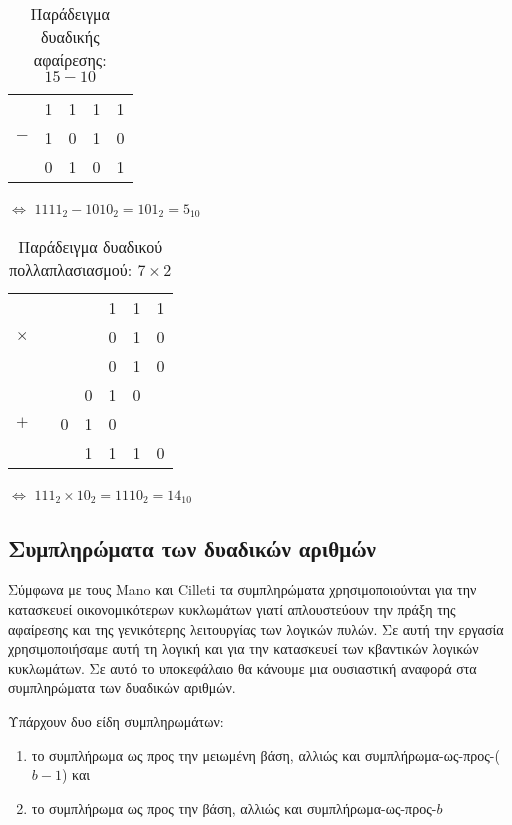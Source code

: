 \qquad

\begin{table}[ht]
    \centering
    \begin{tabular}{ccccc}
          & 1 & 1 & 1 & 1 \\
        $-$ & 1 & 0 & 1 & 0 \\
        \hline
          & 0 & 1 & 0 & 1 \\
    \end{tabular}
    \hspace{1cm}
    $\Longleftrightarrow $
    \hspace{1cm}
    $1111_2 - 1010_2 = 101_2 = 5_{10}$
    \caption{Παράδειγμα δυαδικής αφαίρεσης: $15 - 10$}
\end{table}

\qquad

\begin{table}[ht]
    \centering
    \begin{tabular}{ccccccc}
        &&&&1&1&1\\
        $\times$&&&&0&1&0\\
        \hline
        &&&&0&1&0\\
        &&&0&1&0&\\
        $+$&&0&1&0&&\\
        \hline
        &&&1&1&1&0\\
    \end{tabular}
    \hspace{1cm}
    $\Longleftrightarrow $
    \hspace{1cm}
    $111_2 \times 10_2 = 1110_2 = 14_{10}$
    \caption{Παράδειγμα δυαδικού πολλαπλασιασμού: $7 \times 2$}
\end{table}

\subsection{Συμπληρώματα των δυαδικών αριθμών}

Σύμφωνα με τους Mano και Cilleti \cite{ManoCilleti2018} τα συμπληρώματα χρησιμοποιούνται για την κατασκευεί οικονομικότερων κυκλωμάτων γιατί
απλουστεύουν την πράξη της αφαίρεσης και της γενικότερης λειτουργίας των λογικών πυλών. Σε αυτή την εργασία χρησιμοποιήσαμε αυτή τη λογική και για
την κατασκευεί των κβαντικών λογικών κυκλωμάτων. Σε αυτό το υποκεφάλαιο θα κάνουμε μια ουσιαστική αναφορά στα συμπληρώματα των δυαδικών αριθμών.

Υπάρχουν δυο είδη συμπληρωμάτων:

\begin{enumerate}
    \item το συμπλήρωμα ως προς την μειωμένη βάση, αλλιώς και συμπλήρωμα-ως-προς-($b-1$) και
    \item το συμπλήρωμα ως προς την βάση, αλλιώς και συμπλήρωμα-ως-προς-$b$
\end{enumerate}

